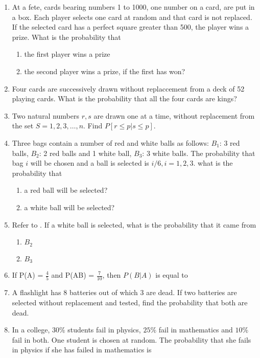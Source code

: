 \begin{enumerate}[label=\thesubsection.\arabic*,ref=\thesubsection.\theenumi,resume*]
\\
\solution 

\item At a fete, cards bearing numbers 1 to 1000, one number on a card, are put in a box. Each player selects one card at random and that card is not replaced. If the selected card has a perfect square greater than 500, the player wins a prize. What is the probability that 
\begin{enumerate}
\item the first player wins a prize
\item the second player wins a prize, if the first has won?
\end{enumerate}
\solution

\item Four cards are successively drawn without replaccement from a deck of 52 playing cards. What is the probability that all the four cards are kings?
\\
\solution

\item Two natural numbers $r, s$ are drawn one at a time, without replacement from
the set $S = {1,2,3, \ldots,n}$. Find $P[r\le p|s\le p]$.
\\
\solution 

\item Three bags contain a number of red and white balls as follows:
$B_1$: 3 red balls, $B_2$: 2 red balls and 1 white ball, $B_3$: 3 white balls.
The probability that bag $i$ will be chosen and a ball is selected is $i/6, i=1,2,3$.
what is the probability that
\label{prob:12/13/3/41}
\begin{enumerate}
	\item a red ball will be selected?     
	\item  a white ball will be selected?
\end{enumerate}
\solution

%
\item Refer to . If a white ball is selected, what is the probability that it came from
\begin{enumerate}
\item  $B_2$
\item  $B_3$
\end{enumerate}
\solution

\item If P(A) = $\frac{4}{5}$ and P(AB) = $\frac{7}{10}$, then $P(B|A)$ is equal to\\
\solution

\item A flashlight has 8 batteries out of which 3 are dead. If two batteries are selected without replacement and tested, find the probability that both are dead.\\
\solution

\item In a college, $30\%$ students fail in physics, $25\%$ fail in mathematics and $10\%$ fail in both. One student is chosen at random. The probability that she fails in physics if she has failed in mathematics is


\end{enumerate}
